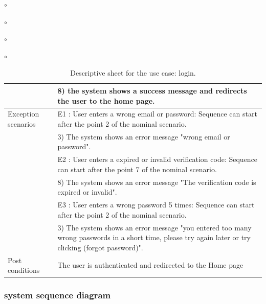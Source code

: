 \documentclass[]{uc2pfecaneva}
\begin{document}
\begin{list}{$\circ$}{}
\begin{list}{$\circ$}{}
\begin{list}{$\circ$}{}
\begin{list}{$\circ$}{}
\begin{table}[h]
\begin{tabularx}{\textwidth}{|l|X|}
            & \hspace{4mm}8) the system shows a success message and redirects the user to the home page.                                                                         \\ \hline
            Exception scenarios
            & E1 : User enters a wrong email or password: Sequence can start after the point 2 of the nominal scenario.                                                            \\
            & \hspace{4mm}3) The system shows an error message "wrong email or password".                                                                                        \\
            & E2 : User enters a expired or invalid verification code: Sequence can start after the point 7 of the nominal scenario.                                               \\
            & \hspace{4mm}8) The system shows an error message "The verification code is expired or invalid".                                                                    \\
            & E3 : User enters a wrong password 5 times: Sequence can start after the point 2 of the nominal scenario.                                                             \\
            & \hspace{4mm}3) The system shows an error message "you entered too many wrong passwords in a short time, please try again later or try clicking (forgot password)". \\
            Post conditions
            & The user is authenticated and redirected to the Home page                                                                                                            \\ \hline
        \end{tabularx}
        \caption{Descriptive sheet for the use case: login.}
        \label{table:1}
    \end{table}
    \clearpage

    \subsubsection{system sequence diagram}
    \begin{figure}[h]


\end{figure}
\end{list}
\end{list}
\end{list}
\end{list}
\end{document}
